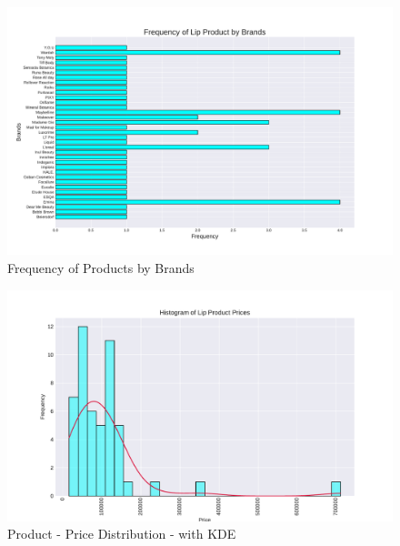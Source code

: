 \documentclass{article}
\begin{document}
\begin{center}
    \begin{figure}[htbp]
        \centering
        \includegraphics[scale=0.5]{../images/Indonesia-graphs/Brand_Frequency.pdf}
        \caption{Frequency of Products by Brands}
        \label{Products_by_Brands}
    \end{figure}

    \begin{figure}[htbp]
        \centering
        \includegraphics[scale=0.6]{../images/Indonesia-graphs/KDE_Prices.pdf}
        \caption{Product - Price Distribution - with KDE}
        \label{KDE_Prices}
    \end{figure}


\end{center}
\end{document}
